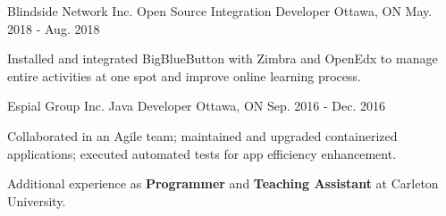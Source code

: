 \begin{cventries}

\cventry
{Blindside Network Inc.}
{Open Source Integration Developer}
{Ottawa, ON}
{May. 2018 - Aug. 2018}
{\begin{cvitems}
    \item {Installed and integrated BigBlueButton with Zimbra and OpenEdx to manage entire activities at one spot and improve online learning process.}
\end{cvitems}}

\cventry
{Espial Group Inc.}
{Java Developer}
{Ottawa, ON}
{Sep. 2016 - Dec. 2016}
{\begin{cvitems}
    \item {Collaborated in an Agile team; maintained and upgraded containerized applications; executed automated tests for app efficiency enhancement.}
\end{cvitems}}

Additional experience as \textbf{Programmer} and \textbf{Teaching Assistant} at Carleton University.
\end{cventries}
